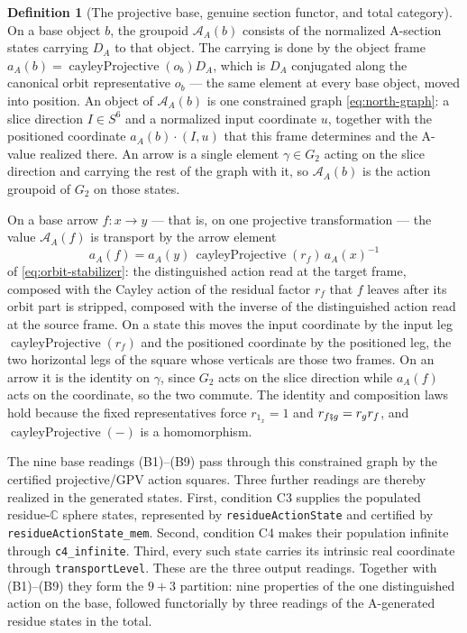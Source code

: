\documentclass[11pt]{article}
\newcommand{\CC}{\mathbb{C}}
\theoremstyle{plain}
\theoremstyle{definition}
\newtheorem{definition}[theorem]{Definition}
\theoremstyle{remark}
\begin{document}
\begin{definition}[The projective base, genuine section functor, and total category]
On a base object $b$, the groupoid $\mathcal A_A(b)$ consists of the normalized
A-section states carrying $D_A$ to that object. The carrying is done by the
object frame $a_A(b)=\operatorname{cayleyProjective}(o_b)D_A$, which is $D_A$
conjugated along the canonical orbit representative $o_b$ --- the same element
at every base object, moved into position. An object of
$\mathcal A_A(b)$ is one constrained graph \eqref{eq:north-graph}: a slice
direction $I\in S^6$ and a normalized input coordinate $u$, together with the
positioned coordinate $a_A(b)\mathbin{\cdot}(I,u)$ that this frame determines
and the A-value realized there. An arrow is a single element $\gamma\in G_2$
acting on the slice direction and carrying the rest of the graph with it, so
$\mathcal A_A(b)$ is the action groupoid of $G_2$ on those states.

On a base arrow $f:x\to y$ --- that is, on one projective transformation ---
the value $\mathcal A_A(f)$ is transport by the arrow element
\[
  a_A(f)=a_A(y)\,\operatorname{cayleyProjective}(r_f)\,a_A(x)^{-1}
\]
of \eqref{eq:orbit-stabilizer}: the distinguished action read at the target
frame, composed with the Cayley action of the residual factor $r_f$ that $f$
leaves after its orbit part is stripped, composed with the inverse of the
distinguished action read at the source frame. On a state this moves the input
coordinate by the input leg $\operatorname{cayleyProjective}(r_f)$ and the
positioned coordinate by the positioned leg, the two horizontal legs of the
square whose verticals are those two frames. On an arrow it is the identity on
$\gamma$, since $G_2$ acts on the slice direction while $a_A(f)$ acts on the
coordinate, so the two commute. The identity and composition laws hold because
the fixed representatives force $r_{1_x}=1$ and
$r_{f\fatsemi g}=r_g r_f$, and $\operatorname{cayleyProjective}(-)$ is a
homomorphism.

The nine base readings \textup{(B1)--(B9)} pass through this constrained graph by the certified
projective/GPV action squares. Three further readings are thereby realized in the generated
states. First, condition \textup{C3} supplies the populated residue-$\CC$ sphere states, represented
by \texttt{residueActionState} and certified by \texttt{residueActionState\_mem}. Second,
condition \textup{C4} makes their population infinite through \texttt{c4\_infinite}. Third, every
such state carries its intrinsic real coordinate through \texttt{transportLevel}. These are the
three output readings. Together with \textup{(B1)--(B9)} they form the $9+3$ partition: nine
properties of the one distinguished action on the base, followed functorially by three readings
of the A-generated residue states in the total.


\end{definition}
\end{document}

